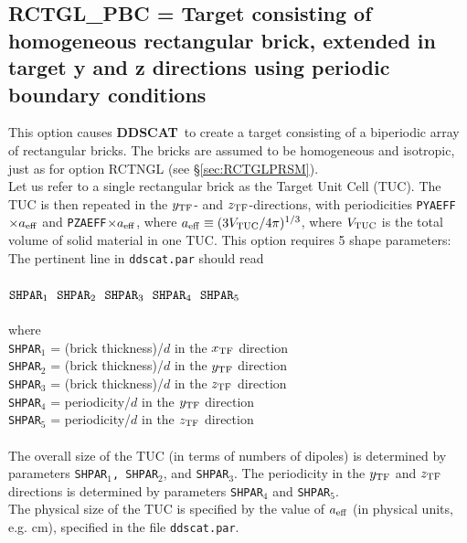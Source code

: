 \subsection{ RCTGL\_PBC = Target consisting of homogeneous rectangular brick, 
                     extended in
                     target y and z directions using
                     periodic boundary conditions}
            \label{sec:RCTGL_PBC}
            This option causes {{\bf DDSCAT}}\ to create a target consisting
	    of a biperiodic array of rectangular bricks.  
	    The bricks are assumed to be homogeneous and isotropic,
	    just as for option RCTNGL (see \S\ref{sec:RCTGLPRSM}).
	    \ \\
	    Let us 
	    refer to a single rectangular brick as the Target Unit Cell (TUC).
	    The TUC 
	    is then repeated in the $y_{\rm TF}$- and $z_{\rm TF}$-directions, with 
	    periodicities {\tt PYAEFF}$\times {a}_{\rm eff}$ and 
	    {\tt PZAEFF}$\times {a}_{\rm eff}$, where 
	    ${a}_{\rm eff}\equiv(3V_{\rm TUC}/4\pi)^{1/3}$,
	    where $V_{\rm TUC}$ 
	    is the total volume of solid material in one TUC.
	    This option requires 5 shape parameters:\newline
	    The pertinent line in {\tt ddscat.par} should read\\
	    \ \\
	${\tt SHPAR}_1~~{\tt SHPAR}_2~~{\tt SHPAR}_3~~{\tt SHPAR}_4~~{\tt SHPAR}_5$\\
	    \ \\
	where\\
	{\tt SHPAR$_1$} = (brick thickness)/$d$ in the $x_{\rm TF}$ direction\\
	{\tt SHPAR$_2$} = (brick thickness)/$d$ in the $y_{\rm TF}$ direction\\
	{\tt SHPAR}$_3$ = (brick thickness)/$d$ in the $z_{\rm TF}$ direction\\
	{\tt SHPAR}$_4$ = periodicity/$d$ in the $y_{\rm TF}$ direction\\
	{\tt SHPAR}$_5$ = periodicity/$d$ in the $z_{\rm TF}$ direction\\
	\ \\
	The overall size of the TUC (in terms of numbers of
	dipoles) is determined by parameters 
	{\tt SHPAR$_1$, SHPAR$_2$}, and {\tt SHPAR}$_3$.
	The periodicity in the $y_{\rm TF}$ and $z_{\rm TF}$ directions is determined
	by parameters {\tt SHPAR}$_4$ and {\tt SHPAR}$_5$.\\
	The physical size of the TUC is specified by the value of
	${a}_{\rm eff}$ (in physical units, e.g. cm), 
	specified in the file {\tt ddscat.par}.

